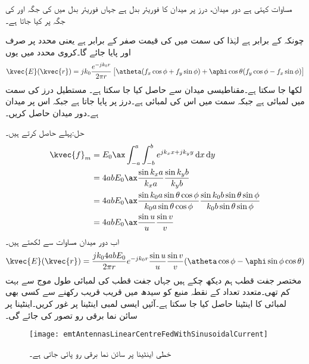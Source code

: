 مساوات  کہتی ہے دور میدان، درز پر میدان کا فوریئر بدل ہے جہاں فوریئر بدل میں  کی جگہ  اور  کی جگہ  پر کیا جاتا ہے۔

چونکہ  کے برابر ہے لہٰذا  کی سمت میں  کی قیمت صفر کے برابر ہے یعنی  محدد پر صرف  اور  پایا جائے گا۔کروی محدد میں یوں
\begin{align}\label{مساوات_اینٹینا_دور_میدان_بذریعہ_فوریئر_بدل}
\kvec{E}(\kvec{r})=j k_0 \frac{e^{-j k_0 r}}{2\pi r}\left[\atheta (f_x \cos\phi+f_y \sin\phi)+\aphi \cos \theta (f_y\cos\phi-f_x\sin\phi) \right]
\end{align}
لکھا جا سکتا ہے۔مقناطیسی میدان  سے حاصل کیا جا سکتا ہے۔
مستطیل درز کی  سمت میں لمبائی  ہے جبکہ  سمت میں اس کی لمبائی  ہے۔درز  پر پایا جاتا  ہے جبکہ اس پر
 میدان  ہے۔دور میدان حاصل کریں۔

حل:پہلے  حاصل کرتے ہیں۔
\begin{align*}
\kvec{f}_m&=E_0 \ax \int_{-a}^{a}\int_{-b}^{b} e^{j k_x x +j k_y y} \dif x \dif y\\
&=4 a b E_0 \ax \frac{\sin k_x a}{k_x a}\frac{\sin k_y b}{k_y b}\\
&=4 a b E_0 \ax \frac{\sin k_0 a \sin \theta \cos \phi}{k_0 a\sin \theta \cos \phi}\frac{\sin k_0 b \sin \theta \sin\phi}{k_0 b\sin\theta\sin\phi}\\
&=4 a b E_0 \ax \frac{\sin u}{u} \frac{\sin v}{v}
\end{align*}
اب دور میدان مساوات  سے لکھتے ہیں۔
\begin{align*}
\kvec{E}(\kvec{r})=\frac{j k_0 4 a bE_0}{2\pi r}e^{-j k_0 r}\frac{\sin u}{u}\frac{\sin v}{v} (\atheta \cos\phi-\aphi \sin\phi\cos\theta)
\end{align*}
مختصر جفت قطب ہم دیکھ چکے ہیں جہاں جفت قطب کی لمبائی طول موج سے بہت کم  تھی۔متعدد تعداد کے نقطہ منبع کو سیدھ میں قریب قریب رکھنے سے کسی بھی لمبائی کا اینٹینا حاصل کیا جا سکتا ہے۔آئیں ایسی لمبی اینٹینا پر غور کریں۔اینٹینا پر سائن نما برقی رو تصور کی جائے گی۔

\begin{figure}
\centering
\texttt{[image: emtAntennasLinearCentreFedWithSinusoidalCurrent]}
\caption{خطی اینٹینا پر سائن نما برقی رو پائی جاتی ہے۔}
\label{شکل_اینٹینا_خطی_سائن_نما_برقی_رو}
\end{figure}

